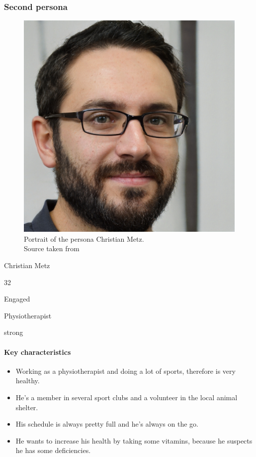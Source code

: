 \documentclass[conference]{IEEEtran}
\begin{document}
\subsubsection{Second persona} \hfill
\begin{figure}[h]
	\centerline{\includegraphics[width=.5\linewidth]{images/persona02.jpg}}
	\caption[Portrait of the persona Christian Metz; Source taken from \cite{personaimg}]
	{Portrait of the persona Christian Metz.\\ Source taken from \cite{personaimg}\endtabular}
	\label{fig:persona2}
\end{figure}

\begin{description}[labelwidth=\widthof{\bfseries Computer skills},leftmargin=.8cm,labelindent=.8cm]
	\item[Name] Christian Metz
	\item[Age] 32
	\item[Marital status] Engaged
	\item[Occupation] Physiotherapist
	\item[Computer skills] strong
\end{description}

\paragraph*{Key characteristics}
\begin{itemize}[leftmargin=1.25cm]
	\item Working as a physiotherapist and doing a lot of sports, therefore is very healthy.
	\item He's a member in several sport clubs and a volunteer in the local animal shelter.
	\item His schedule is always pretty full and he's always on the go.
	\item He wants to increase his health by taking some vitamins, because he suspects he has some deficiencies.
\end{itemize}
\end{document}
